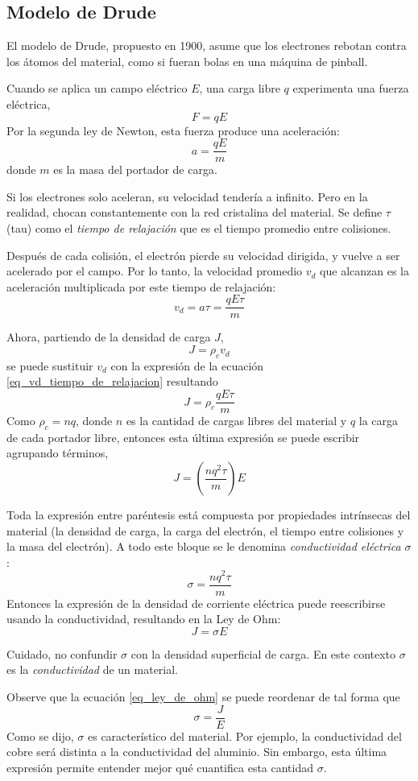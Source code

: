 \subsection{Modelo de Drude}

El modelo de Drude, propuesto en 1900, asume que los electrones rebotan contra los átomos del material, como si fueran bolas en una máquina de pinball. 

Cuando se aplica un campo eléctrico \(E\), una carga libre \(q\) experimenta una fuerza eléctrica,
\[
  F=qE
\]
Por la segunda ley de Newton, esta fuerza produce una aceleración:
\[
  a=\frac{qE}{m}
\]
donde \(m\) es la masa del portador de carga.

Si los electrones solo aceleran, su velocidad tendería a infinito. Pero en la realidad, chocan constantemente con la red cristalina del material. Se define \(\tau\) (tau) como el \emph{tiempo de relajación} que es el tiempo promedio entre colisiones.

Después de cada colisión, el electrón pierde su velocidad dirigida, y vuelve a ser acelerado por el campo. Por lo tanto, la velocidad promedio \(v_d\) que alcanzan es la aceleración multiplicada por este tiempo de relajación:
\begin{equation}\label{eq_vd_tiempo_de_relajacion}
  v_d = a\tau = \frac{qE\tau}{m}
\end{equation}

Ahora, partiendo de la densidad de carga \(J\), 
\[
  J=\rho_c v_d
\]
se puede sustituir \(v_d\) con la expresión de la ecuación \eqref{eq_vd_tiempo_de_relajacion} resultando 
\[
  J=\rho_c \frac{qE\tau}{m}
\]
Como \(\rho_c=nq\), donde \(n\) es la cantidad de cargas libres del material y \(q\) la carga de cada portador libre, entonces esta última expresión se puede escribir agrupando términos,
\[
  J=\left(\frac{nq^2 \tau}{m}\right) E
\]

Toda la expresión entre paréntesis está compuesta por propiedades intrínsecas del material (la densidad de carga, la carga del electrón, el tiempo entre colisiones y la masa del electrón). A todo este bloque se le denomina \emph{conductividad eléctrica} \(\sigma\):
\[
  \sigma = \frac{nq^2\tau}{m}
\]
Entonces la expresión de la densidad de corriente eléctrica puede reescribirse usando la conductividad, resultando en la Ley de Ohm:
\begin{equation}\label{eq_ley_de_ohm}
  J=\sigma E
\end{equation}
\begin{tcolorbox}[mydanger]
  Cuidado, no confundir \(\sigma\) con la densidad superficial de carga. En este contexto \(\sigma\) es la \emph{conductividad} de un material.
\end{tcolorbox}
Observe que la ecuación \eqref{eq_ley_de_ohm} se puede reordenar de tal forma que 
\[
  \sigma= \frac{J}{E}
\]
Como se dijo, \(\sigma\) es característico del material. Por ejemplo, la conductividad del cobre será distinta a la conductividad del aluminio. Sin embargo, esta última expresión permite entender mejor qué cuantifica esta cantidad \(\sigma\). 

